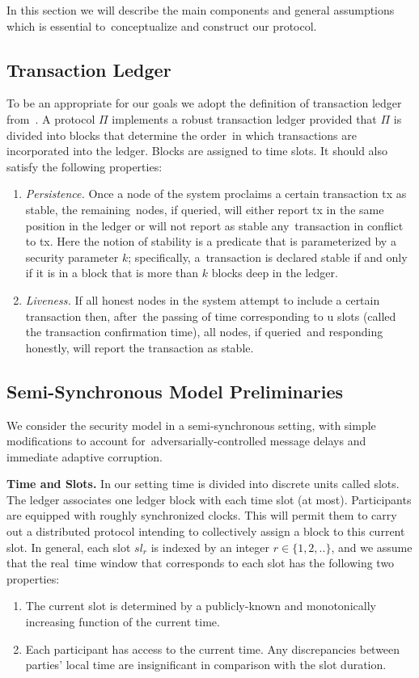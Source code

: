 In this section we will describe the main components and general assumptions which is essential to\
conceptualize and construct our protocol.

\subsection{Transaction Ledger}\label{subsec:transaction-ledger.}
To be an appropriate for our goals we adopt the definition of transaction ledger from~\cite{cryptoeprint:2016/889}.
A protocol $\Pi$ implements a robust transaction ledger provided that $\Pi$ is divided into blocks that determine the order\
in which transactions are incorporated into the ledger.
Blocks are assigned to time slots.
It should also satisfy the following properties:
\begin{enumerate}
    \item \emph{Persistence.} Once a node of the system proclaims a certain transaction tx as stable, the remaining\
    nodes, if queried, will either report tx in the same position in the ledger or will not report as stable any\
    transaction in conflict to tx.
    Here the notion of stability is a predicate that is parameterized by a security parameter $k$; specifically, a\
    transaction is declared stable if and only if it is in a block that is more than $k$ blocks deep in the ledger.
    \item \emph{Liveness.} If all honest nodes in the system attempt to include a certain transaction then, after\
    the passing of time corresponding to u slots (called the transaction confirmation time), all nodes, if queried\
    and responding honestly, will report the transaction as stable.
\end{enumerate}

\subsection{Semi-Synchronous Model Preliminaries}\label{subsec:the-semi-synchronous-model-preliminaries.}
We consider the security model in a semi-synchronous setting, with simple modifications to account for\
adversarially-controlled message delays and immediate adaptive corruption.

\textbf{Time and Slots.}
In our setting time is divided into discrete units called slots.
The ledger associates one ledger block with each time slot (at most).
Participants are equipped with roughly synchronized clocks.
This will permit them to carry out a distributed protocol intending to collectively assign a block to this current slot.
In general, each slot $sl_r$ is indexed by an integer $r \in \{1, 2, ..\}$, and we assume that the real\
time window that corresponds to each slot has the following two properties:
\begin{enumerate}
    \item The current slot is determined by a publicly-known and monotonically increasing function of the current time.
    \item Each participant has access to the current time.
    Any discrepancies between parties' local time are insignificant in comparison with the slot duration.
\end{enumerate}

